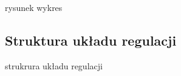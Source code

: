 \documentclass[a4paper, 11pt]{article}
\begin{document}
rysunek wykres 


\subsection{Struktura układu regulacji} 
strukrura układu regulacji 










      
\end{document}
